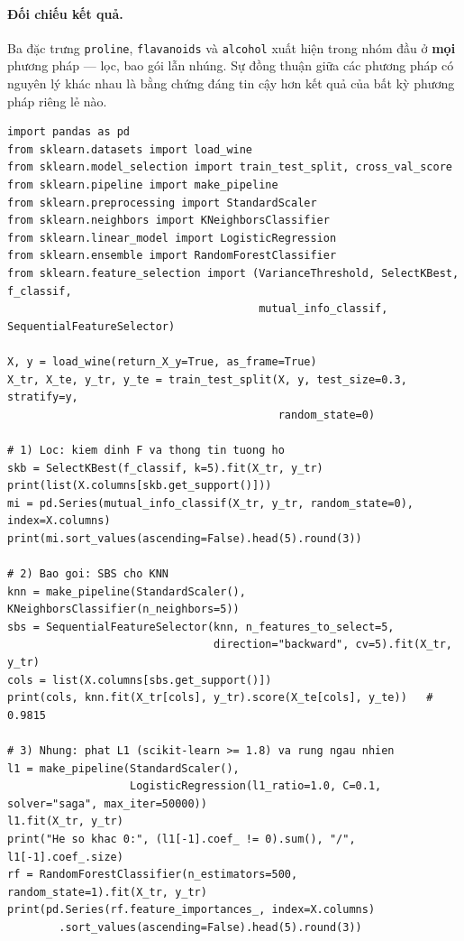 \paragraph{Đối chiếu kết quả.} Ba đặc trưng \texttt{proline}, \texttt{flavanoids} và \texttt{alcohol} xuất hiện trong nhóm đầu ở \textbf{mọi} phương pháp --- lọc, bao gói lẫn nhúng. Sự đồng thuận giữa các phương pháp có nguyên lý khác nhau là bằng chứng đáng tin cậy hơn kết quả của bất kỳ phương pháp riêng lẻ nào.

\begin{lstlisting}[caption={Ba họ phương pháp lựa chọn đặc trưng trên bộ dữ liệu Wine}]
import pandas as pd
from sklearn.datasets import load_wine
from sklearn.model_selection import train_test_split, cross_val_score
from sklearn.pipeline import make_pipeline
from sklearn.preprocessing import StandardScaler
from sklearn.neighbors import KNeighborsClassifier
from sklearn.linear_model import LogisticRegression
from sklearn.ensemble import RandomForestClassifier
from sklearn.feature_selection import (VarianceThreshold, SelectKBest, f_classif,
                                       mutual_info_classif, SequentialFeatureSelector)

X, y = load_wine(return_X_y=True, as_frame=True)
X_tr, X_te, y_tr, y_te = train_test_split(X, y, test_size=0.3, stratify=y,
                                          random_state=0)

# 1) Loc: kiem dinh F va thong tin tuong ho
skb = SelectKBest(f_classif, k=5).fit(X_tr, y_tr)
print(list(X.columns[skb.get_support()]))
mi = pd.Series(mutual_info_classif(X_tr, y_tr, random_state=0), index=X.columns)
print(mi.sort_values(ascending=False).head(5).round(3))

# 2) Bao goi: SBS cho KNN
knn = make_pipeline(StandardScaler(), KNeighborsClassifier(n_neighbors=5))
sbs = SequentialFeatureSelector(knn, n_features_to_select=5,
                                direction="backward", cv=5).fit(X_tr, y_tr)
cols = list(X.columns[sbs.get_support()])
print(cols, knn.fit(X_tr[cols], y_tr).score(X_te[cols], y_te))   # 0.9815

# 3) Nhung: phat L1 (scikit-learn >= 1.8) va rung ngau nhien
l1 = make_pipeline(StandardScaler(),
                   LogisticRegression(l1_ratio=1.0, C=0.1, solver="saga", max_iter=50000))
l1.fit(X_tr, y_tr)
print("He so khac 0:", (l1[-1].coef_ != 0).sum(), "/", l1[-1].coef_.size)
rf = RandomForestClassifier(n_estimators=500, random_state=1).fit(X_tr, y_tr)
print(pd.Series(rf.feature_importances_, index=X.columns)
        .sort_values(ascending=False).head(5).round(3))
\end{lstlisting}


